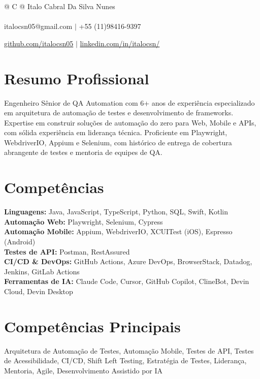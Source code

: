 \documentclass[a4paper,8pt]{article}
\begin{document}
\pagestyle{empty}


\begin{tabularx}{\linewidth}{@{} C @{}}
\color[HTML]{1C033C} \Huge{Italo Cabral Da Silva Nunes} \\[6pt]
\\
\textcolor[HTML]{371e77}{{{{\faEnvelope} italocsn05@gmail.com}} $|$}
\textcolor[HTML]{371e77}{{{\faMobile} +55 (11)98416-9397}}

\textcolor[HTML]{371e77}{\underline{{\raisebox{-0.05\height}{\faGithub}github.com/italocsn05}} $|$}
\textcolor[HTML]{371e77}{\underline{{\raisebox{-0.05\height}{\faLinkedin}linkedin.com/in/italocsn/}}}
\end{tabularx}

\section{Resumo Profissional}
\color[HTML]{1C033C}Engenheiro S\^enior de QA Automation com 6+ anos de experi\^encia especializado em arquitetura de automa\c{c}\~ao de testes e desenvolvimento de frameworks. Expertise em construir solu\c{c}\~oes de automa\c{c}\~ao do zero para Web, Mobile e APIs, com s\'olida experi\^encia em lideran\c{c}a t\'ecnica. Proficiente em Playwright, WebdriverIO, Appium e Selenium, com hist\'orico de entrega de cobertura abrangente de testes e mentoria de equipes de QA.

\section{Compet\^encias}
\color[HTML]{1C033C}\textbf{Linguagens:} Java, JavaScript, TypeScript, Python, SQL, Swift, Kotlin\\[3pt]
\color[HTML]{1C033C}\textbf{Automa\c{c}\~ao Web:} Playwright, Selenium, Cypress\\[3pt]
\color[HTML]{1C033C}\textbf{Automa\c{c}\~ao Mobile:} Appium, WebdriverIO, XCUITest (iOS), Espresso (Android)\\[3pt]
\color[HTML]{1C033C}\textbf{Testes de API:} Postman, RestAssured\\[3pt]
\color[HTML]{1C033C}\textbf{CI/CD \& DevOps:} GitHub Actions, Azure DevOps, BrowserStack, Datadog, Jenkins, GitLab Actions\\[3pt]
\color[HTML]{1C033C}\textbf{Ferramentas de IA:} Claude Code, Cursor, GitHub Copilot, ClineBot, Devin Cloud, Devin Desktop\\[3pt]

\section{Compet\^encias Principais}
Arquitetura de Automa\c{c}\~ao de Testes, Automa\c{c}\~ao Mobile, Testes de API, Testes de Acessibilidade, CI/CD, Shift Left Testing, Estrat\'egia de Testes, Lideran\c{c}a, Mentoria, Agile, Desenvolvimento Assistido por IA
\end{document}
